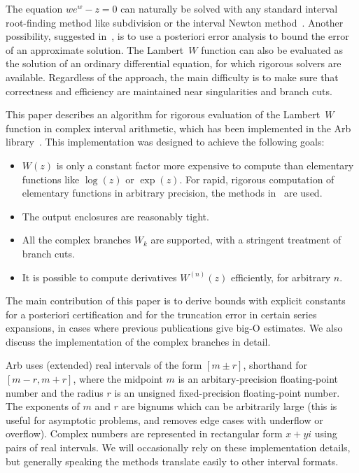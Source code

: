 \documentclass[11pt,a4paper]{article}
\begin{document}
The equation $w e^w - z = 0$ can naturally be solved with any standard
interval root-finding method like subdivision
or the interval Newton method~\cite{moore1979methods}.
Another possibility, suggested in~\cite{corless1996lambertw},
is to use a posteriori error analysis to bound the error of an approximate solution.
The Lambert~$W$ function can also be evaluated as the solution
of an ordinary differential equation, for which rigorous solvers are available.
Regardless of the approach, the main difficulty is to
make sure that correctness and efficiency are maintained near
singularities and branch cuts.

This paper describes an algorithm
for rigorous evaluation of the Lambert~$W$ function in complex interval
arithmetic, which has been
implemented in the Arb library~\cite{Johansson2017arb}.
This implementation was designed to achieve the following goals:
\begin{itemize}
\setlength{\itemsep}{3pt}
\setlength{\parskip}{0pt}
\setlength{\parsep}{0pt}
\item $W(z)$ is only a constant factor more expensive
to compute than elementary functions like $\log(z)$ or $\exp(z)$.
For rapid, rigorous computation of elementary functions in arbitrary precision,
the methods in~\cite{Johansson2015elementary} are used.
\item The output enclosures are reasonably tight.
\item All the complex branches $W_k$ are supported, with a stringent treatment of branch cuts.
\item It is possible to compute derivatives $W^{(n)}(z)$ efficiently, for arbitrary $n$.
\end{itemize}
The main contribution of this paper is to derive bounds with explicit constants
for a posteriori certification
and for the truncation error in certain series expansions, in
cases where previous publications give big-O estimates.
We also discuss the implementation of the complex branches in detail.

Arb uses (extended) real intervals of the form $[m \pm r]$, shorthand for
$[m-r, m+r]$, where the midpoint
$m$ is an arbitary-precision floating-point number and the radius
$r$ is an unsigned fixed-precision floating-point number.
The exponents of $m$ and $r$ are bignums which can be arbitrarily large
(this is useful for asymptotic problems, and removes edge cases
with underflow or overflow).
Complex numbers are represented in rectangular form $x+yi$ using
pairs of real intervals.
We will occasionally rely on these implementation details,
but generally speaking the methods
translate easily to other interval formats.
\end{document}
